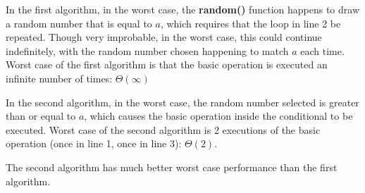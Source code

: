 \documentclass{article}
\begin{document}
	In the first algorithm, in the worst case, the \textbf{random()} function happens to draw a random number that is equal to $a$, which requires that the loop in line 2 be repeated.  Though very improbable, in the worst case, this could continue indefinitely, with the random number chosen happening to match $a$ each time.  Worst case of the first algorithm is that the basic operation is executed an infinite number of times: $\Theta(\infty)$
	
	In the second algorithm, in the worst case, the random number selected is greater than or equal to $a$, which causes the basic operation inside the conditional to be executed.  Worst case of the second algorithm is 2 executions of the basic operation (once in line 1, once in line 3): $\Theta(2)$.
	
	The second algorithm has much better worst case performance than the first algorithm.
\end{document}

